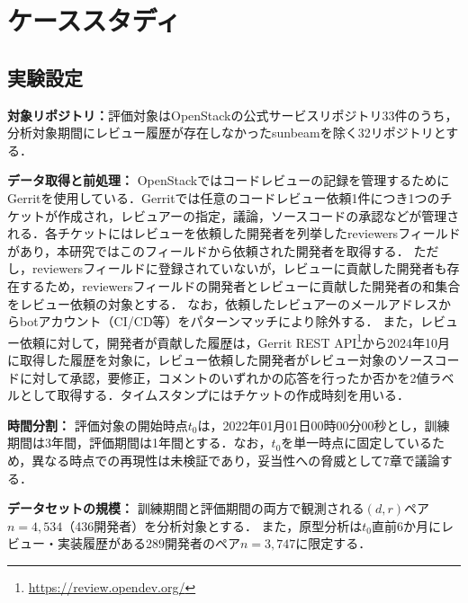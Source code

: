 \documentclass[submit,noauthor,ses,dvipdfmx]{ipsj}
\newcommand{\todo}[1]{\colorbox{yellow}{{\bf TODO}:}{\color{red} {\textbf{[#1]}}}}
\begin{document}
\section{ケーススタディ}\label{sec:case}

\subsection{実験設定}

\noindent\textbf{対象リポジトリ：}評価対象はOpenStackの公式サービスリポジトリ33件のうち，分析対象期間にレビュー履歴が存在しなかったsunbeamを除く32リポジトリとする．

\noindent\textbf{データ取得と前処理：}
OpenStackではコードレビューの記録を管理するためにGerritを使用している．Gerritでは任意のコードレビュー依頼1件につき1つのチケットが作成され，レビュアーの指定，議論，ソースコードの承認などが管理される．各チケットにはレビューを依頼した開発者を列挙したreviewersフィールドがあり，本研究ではこのフィールドから依頼された開発者を取得する．
ただし，reviewersフィールドに登録されていないが，レビューに貢献した開発者も存在するため，reviewersフィールドの開発者とレビューに貢献した開発者の和集合をレビュー依頼の対象とする．
なお，依頼したレビュアーのメールアドレスからbotアカウント（CI/CD等）をパターンマッチにより除外する．
また，レビュー依頼に対して，開発者が貢献した履歴は，Gerrit REST API\footnote{\url{https://review.opendev.org/}}から2024年10月に取得した履歴を対象に，レビュー依頼した開発者がレビュー対象のソースコードに対して承認，要修正，コメントのいずれかの応答を行ったか否かを2値ラベルとして取得する．タイムスタンプにはチケットの作成時刻を用いる．

\noindent\textbf{時間分割：}
評価対象の開始時点$t_0$は，2022年01月01日00時00分00秒とし，訓練期間は3年間，評価期間は1年間とする．なお，$t_0$を単一時点に固定しているため，異なる時点での再現性は未検証であり，妥当性への脅威として7章で議論する．

\noindent\textbf{データセットの規模：}
訓練期間と評価期間の両方で観測される$(d, r)$ペア$n = 4,534$（436開発者）を分析対象とする．
また，原型分析は$t_0$直前6か月にレビュー・実装履歴がある289開発者のペア$n = 3,747$に限定する．
\end{document}
